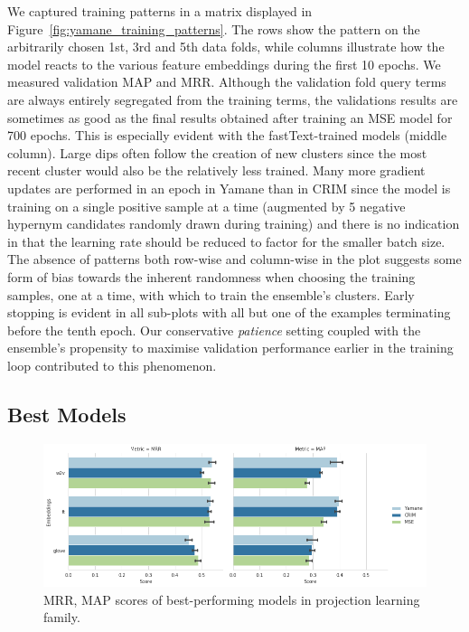 We captured training patterns in a matrix displayed in Figure~\ref{fig:yamane_training_patterns}. The rows show the pattern on the arbitrarily chosen 1st, 3rd and 5th data folds, while columns illustrate how the model reacts to the various feature embeddings during the first 10 epochs.  We measured validation \ac{MAP} and \ac{MRR}.  Although the validation fold query terms are always entirely segregated from the training terms, the validations results are sometimes as good as the final results obtained after training an \ac{MSE} model for 700 epochs.  This is especially evident with the  fastText-trained models (middle column).  Large dips often follow the creation of new clusters since the most recent cluster would also be the relatively less trained.  Many more gradient updates are performed in an epoch in Yamane than in CRIM since the model is training on a single positive sample at a time (augmented by 5 negative hypernym candidates randomly drawn during training) and there is no indication in \citet{yamane2016distributional} that the learning rate should be reduced to factor for the smaller batch size.  The absence of patterns both row-wise and column-wise in the plot suggests some form of bias towards the inherent randomness when choosing the training samples, one at a time, with which to train the ensemble's clusters.  Early stopping is evident in all sub-plots with all but one of the examples terminating before the tenth epoch.  Our conservative \textit{patience} setting coupled with the ensemble's propensity to maximise validation performance earlier in the training loop contributed to this phenomenon.

\subsection{Best Models}
\begin{figure}[ht!] 
  \centering
  \includegraphics[width=1.\linewidth]{images/Comparison_of_best_performing_algorithms.png}
  \caption{\ac{MRR}, \ac{MAP} scores of best-performing models in projection learning family.}
  \label{fig:part1_best_models}
\end{figure}

